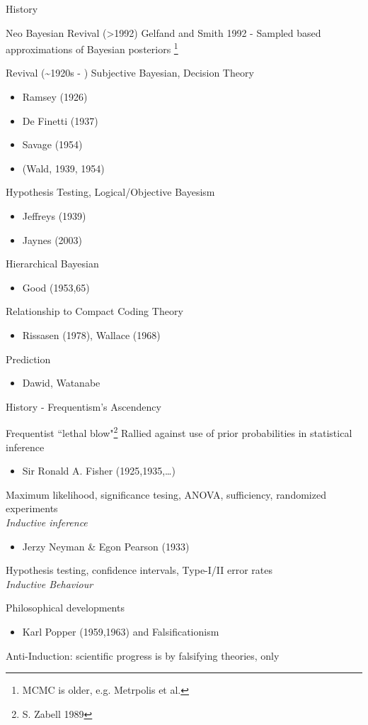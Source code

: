 \documentclass[presentation,9pt,xcolor=dvipsnames]{beamer}
\begin{document}
\begin{frame}[label={sec:org9017b2d}]{History}
\begin{block}{Neo Bayesian Revival (>1992)}
Gelfand and Smith 1992 - Sampled based approximations of Bayesian posteriors \footnote{MCMC is older, e.g. Metrpolis et al. }
\end{block}
\begin{block}{Revival (\textasciitilde{}1920s - )}
Subjective Bayesian, Decision Theory
\begin{itemize}
\item Ramsey (1926)
\item De Finetti (1937)
\item Savage (1954)
\item (Wald, 1939, 1954)
\end{itemize}
Hypothesis Testing, Logical/Objective Bayesism
\begin{itemize}
\item Jeffreys (1939)
\item Jaynes (2003)
\end{itemize}
Hierarchical Bayesian
\begin{itemize}
\item Good (1953,65)
\end{itemize}
Relationship to Compact Coding Theory
\begin{itemize}
\item Rissasen (1978), Wallace (1968)
\end{itemize}
Prediction
\begin{itemize}
\item Dawid, Watanabe
\end{itemize}
\end{block}
\end{frame}
\begin{frame}[label={sec:orgb1da5d1}]{History - Frequentism's Ascendency}
\begin{block}{Frequentist ``lethal blow"\footnote{S. Zabell 1989}}
Rallied against use of prior probabilities in statistical inference
\begin{itemize}
\item Sir Ronald A. Fisher (1925,1935,\ldots{})
\end{itemize}
Maximum likelihood, significance tesing, ANOVA, sufficiency, randomized experiments \\
\emph{Inductive inference}
\begin{itemize}
\item Jerzy Neyman \& Egon Pearson (1933)
\end{itemize}
Hypothesis testing, confidence intervals, Type-I/II error rates\\
\emph{Inductive Behaviour}
\end{block}
\begin{block}{Philosophical developments}
\begin{itemize}
\item Karl Popper (1959,1963) and \alert{Falsificationism}
\end{itemize}
Anti-Induction: scientific progress is by \alert{falsifying} theories, only
\end{block}
\end{frame}
\end{document}
